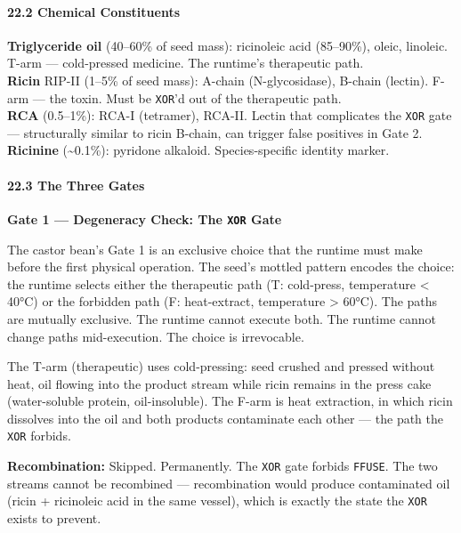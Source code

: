 \documentclass[12pt,a4paper]{article}
\begin{document}
\hypertarget{chemical-constituents-2}{%
\paragraph{22.2 Chemical Constituents}\label{chemical-constituents-2}}

\textbf{Triglyceride oil} (40--60\% of seed mass): ricinoleic acid
(85--90\%), oleic, linoleic. T-arm --- cold-pressed medicine. The
runtime's therapeutic path.\\
\textbf{Ricin} RIP-II (1--5\% of seed mass): A-chain (N-glycosidase),
B-chain (lectin). F-arm --- the toxin. Must be \texttt{XOR}'d out of the
therapeutic path.\\
\textbf{RCA} (0.5--1\%): RCA-I (tetramer), RCA-II. Lectin that
complicates the \texttt{XOR} gate --- structurally similar to ricin
B-chain, can trigger false positives in Gate 2.\\
\textbf{Ricinine} (\textasciitilde0.1\%): pyridone alkaloid.
Species-specific identity marker.

\hypertarget{the-three-gates-2}{%
\paragraph{22.3 The Three Gates}\label{the-three-gates-2}}

\textbf{Gate 1 --- Degeneracy Check: The \texttt{XOR} Gate}

The castor bean's Gate 1 is an exclusive choice that the runtime must
make before the first physical operation. The seed's mottled pattern
encodes the choice: the runtime selects either the therapeutic path (T:
cold-press, temperature \textless{} 40°C) or the forbidden path (F:
heat-extract, temperature \textgreater{} 60°C). The paths are mutually
exclusive. The runtime cannot execute both. The runtime cannot change
paths mid-execution. The choice is irrevocable.

The T-arm (therapeutic) uses cold-pressing: seed crushed and pressed
without heat, oil flowing into the product stream while ricin remains in
the press cake (water-soluble protein, oil-insoluble). The F-arm is heat
extraction, in which ricin dissolves into the oil and both products
contaminate each other --- the path the \texttt{XOR} forbids.

\textbf{Recombination:} Skipped. Permanently. The \texttt{XOR} gate
forbids \texttt{FFUSE}. The two streams cannot be recombined ---
recombination would produce contaminated oil (ricin + ricinoleic acid in
the same vessel), which is exactly the state the \texttt{XOR} exists to
prevent.
\end{document}
